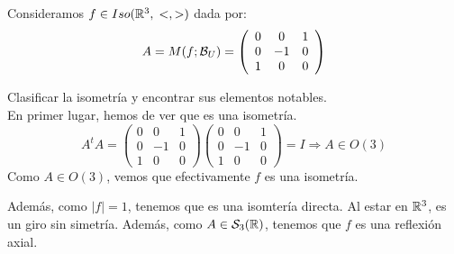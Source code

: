 \begin{ejercicio}
    Consideramos $f\in Iso(\mathbb{R}^3,\;<,>)$ dada por:
    \begin{equation*}
        A=M(f;\mathcal{B}_U) = \left(\begin{array}{ccc}
            0 & 0 & 1\\
            0 & -1 & 0 \\
            1 & 0 & 0
        \end{array}\right)
    \end{equation*}
    
    Clasificar la isometría y encontrar sus elementos notables.\\

    En primer lugar, hemos de ver que es una isometría. 
    \begin{equation*}
        A^tA=\left(\begin{array}{ccc}
            0 & 0 & 1\\
            0 & -1 & 0 \\
            1 & 0 & 0
        \end{array}\right)\left(\begin{array}{ccc}
            0 & 0 & 1\\
            0 & -1 & 0 \\
            1 & 0 & 0
        \end{array}\right)=I \Longrightarrow A\in O(3)   
    \end{equation*}
    Como $A\in O(3)$, vemos que efectivamente $f$ es una isometría.

    Además, como $|f|=1$, tenemos que es una isomtería directa. Al estar en $\mathbb{R}^3$, es un giro sin simetría. Además, como $A\in \mathcal{S}_3(\mathbb{R})$, tenemos que $f$ es una reflexión axial.


\end{ejercicio}
